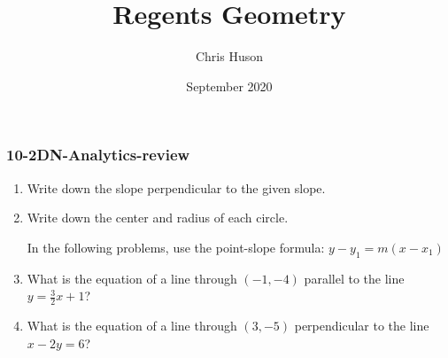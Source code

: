 \documentclass[12pt, twoside]{article}
\title{Regents Geometry}
\author{Chris Huson}
\date{September 2020}
\begin{document}
\subsubsection*{10-2DN-Analytics-review}
\begin{enumerate}
\item Write down the slope perpendicular to the given slope. \vspace{0.5cm}
  \begin{enumerate}
  \end{enumerate}

\item Write down the center and radius of each circle.
  \begin{enumerate}
  \end{enumerate}  \vspace{2cm}

  In the following problems, use the point-slope formula: $y-y_1=m (x-x_1)$
\item What is the equation of a line through $(-1,-4)$ parallel to the line $y=\frac{3}{2}x+1$?  \vspace{2cm}
\item What is the equation of a line through $(3,-5)$ perpendicular to the line $x-2y=6$?  \vspace{3cm}
  

\end{enumerate}
\end{document}
